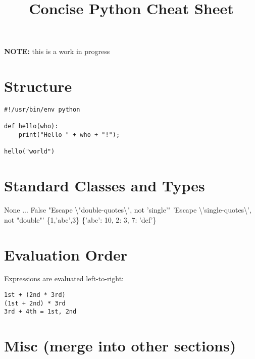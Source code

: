 \documentclass{refcard}
\title{Concise Python Cheat Sheet}
\begin{document}
\maketitle

\begin{center}
{\Large\textbf{NOTE:} this is a work in progress}
\end{center}

\section{Structure}

\begin{verbatim}
#!/usr/bin/env python

def hello(who):
    print("Hello " + who + "!");

hello("world")
\end{verbatim}



\section{Standard Classes and Types}


\begin{ldesc}
	\li[\C{NoneType}]  None
	\li[\C{ellipsis}]  ...
	\li[\C{bool}]      False
	\li[\C{str}]       "Escape \textbackslash{}"double-quotes\textbackslash{}", not 'single'"
	\li[\C{str}]       'Escape \textbackslash{}'single-quotes\textbackslash{}', not "double"'
	\li[\C{list}]      [360,'abc',3.141,360]
	\li[\C{set}]       \{1,'abc',3\}
	\li[\C{dict}]      \{'abc': 10, 2: 3, 7: 'def'\}
\end{ldesc}

\section{Evaluation Order}

Expressions are evaluated left-to-right:
\begin{verbatim}
1st + (2nd * 3rd)
(1st + 2nd) * 3rd
3rd + 4th = 1st, 2nd
\end{verbatim}

\section{Misc (merge into other sections)}
\end{document}
